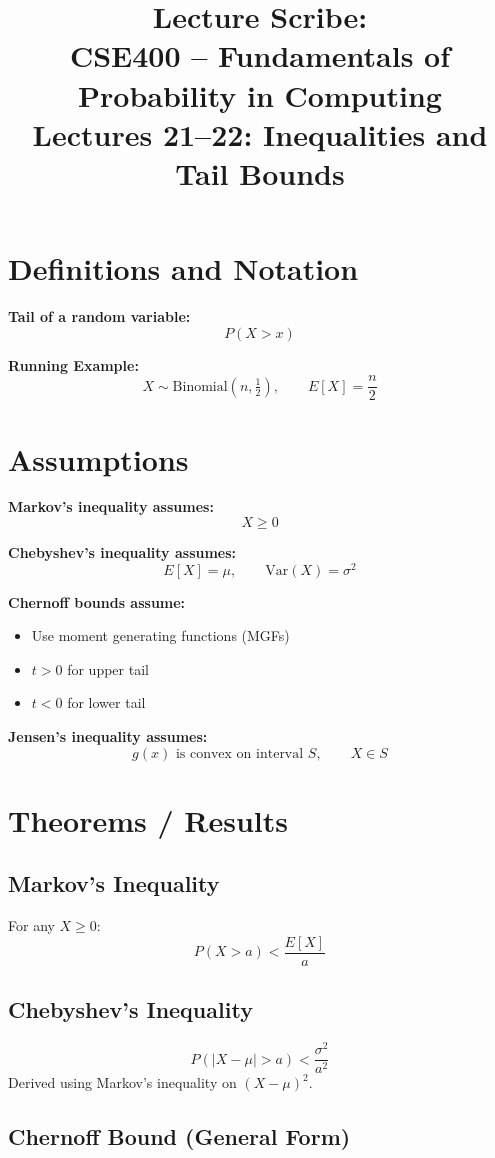 \documentclass[11pt]{article}
\title{Lecture Scribe:\\ CSE400 -- Fundamentals of Probability in Computing\\
Lectures 21--22: Inequalities and Tail Bounds}
\date{}
\begin{document}
\maketitle

\section{Definitions and Notation}

\textbf{Tail of a random variable:}
\[
P(X > x)
\]

\textbf{Running Example:}  
\[
X \sim \text{Binomial}(n, \tfrac12), \qquad E[X] = \frac{n}{2}
\]

\section{Assumptions}

\textbf{Markov's inequality assumes:}
\[
X \ge 0
\]

\textbf{Chebyshev's inequality assumes:}
\[
E[X] = \mu, \qquad \text{Var}(X) = \sigma^2
\]

\textbf{Chernoff bounds assume:}
\begin{itemize}[noitemsep]
    \item Use moment generating functions (MGFs)
    \item $t>0$ for upper tail
    \item $t<0$ for lower tail
\end{itemize}

\textbf{Jensen's inequality assumes:}
\[
g(x) \text{ is convex on interval } S, \qquad X \in S
\]

\section{Theorems / Results}

\subsection*{Markov's Inequality}
For any $X \ge 0$:
\[
P(X > a) < \frac{E[X]}{a}
\]

\subsection*{Chebyshev's Inequality}
\[
P(|X - \mu| > a) < \frac{\sigma^2}{a^2}
\]
Derived using Markov's inequality on $(X-\mu)^2$.

\subsection*{Chernoff Bound (General Form)}
\end{document}
